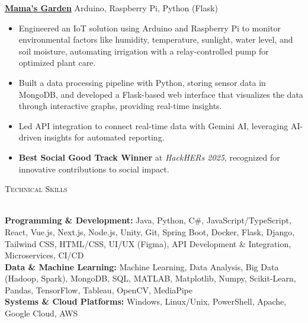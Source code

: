 \documentclass[a4paper]{article}
\newcommand{\lineunder} {
    \vspace*{-8pt} \\
    \hspace*{-18pt} \hrulefill \\
}
\newcommand{\header} [1] {
    {\hspace*{-18pt}\vspace*{6pt} \textsc{#1}}
    \vspace*{-6pt} \lineunder
}
\begin{document}
\vspace{-1mm}
\textbf{\href{https://devpost.com/software/mama-s-garden}{Mama's Garden}} \hfill Arduino, Raspberry Pi, Python (Flask)
\\
\vspace{-3mm}
\begin{itemize} \itemsep -3.5pt
    \item Engineered an IoT solution using Arduino and Raspberry Pi to monitor environmental factors like humidity, temperature, sunlight, water level, and soil moisture, automating irrigation with a relay-controlled pump for optimized plant care.
\item Built a data processing pipeline with Python, storing sensor data in MongoDB, and developed a Flask-based web interface that visualizes the data through interactive graphs, providing real-time insights.
\item Led API integration to connect real-time data with Gemini AI, leveraging AI-driven insights for automated reporting.
\item \textbf{Best Social Good Track Winner} at \textit{HackHERs 2025}, recognized for innovative contributions to social impact.
\end{itemize}
\vspace{-2mm}

\header{Technical Skills}
\vspace{0mm}

\textbf{Programming \& Development:} 
{\small
Java, Python, C\#, JavaScript/TypeScript, React, Vue.js, Next.js, Node.js, Unity, Git, Spring Boot, Docker, Flask, Django, Tailwind CSS, HTML/CSS, UI/UX (Figma), API Development \& Integration, Microservices, CI/CD\\
}
\textbf{Data \& Machine Learning:} 
{\small
Machine Learning, Data Analysis, Big Data (Hadoop, Spark), MongoDB, SQL, MATLAB, Matplotlib, Numpy, Scikit-Learn, Pandas, TensorFlow, Tableau, OpenCV, MediaPipe\\
}
\textbf{Systems \& Cloud Platforms:} 
{\small
Windows, Linux/Unix, PowerShell, Apache, Google Cloud, AWS
}
\end{document}
